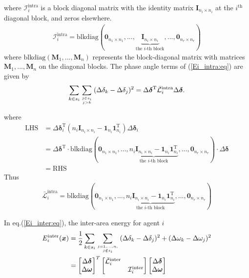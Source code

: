 \documentclass[12pt, draftclsnofoot,onecolumn]{IEEEtran}
\begin{document}
\noindent where $\mathcal I_i^{\mathrm{intra}}$ is a block diagonal matrix with the identity matrix $\boldsymbol{I}_{n_i\times n_i}$ at the $i^{\mathrm{th}}$ diagonal block, and zeros elsewhere.
\begin{align}
\mathcal{I}_i^{\mathrm{intra}} = \mathrm{blkdiag}(\boldsymbol{0}_{n_1\times n_1},..., \underbrace{\boldsymbol{I}_{n_i\times n_i}}_{\mbox{the $i$-th block}},..., \boldsymbol{0}_{n_r\times n_r})
\end{align}
\noindent where $\mathrm{blkdiag}(\boldsymbol{M}_1,...,\boldsymbol{M}_n)$ represents the block-diagonal matrix with matrices $\boldsymbol{M}_1,...,\boldsymbol{M}_n$ on the diagonal blocks. The phase angle terms of (\ref{Ei_intra:eq}) are given by
\begin{align}
\sum_{k\in s_i}\sum_{j\in s_i \atop j>k}{(\Delta \delta_k-\Delta \delta_j)^2} = \Delta {\boldsymbol \delta}^{\mathrm{T}} \bar {\mathcal L}_i^{\mathrm{intra}} \Delta {\boldsymbol \delta}.
\end{align}

\noindent where
\begin{align}
\mathrm{LHS} &= \Delta \boldsymbol{\delta}_i^{\mathrm{T}} \left( n_i \boldsymbol{I}_{n_i\times n_i} - \boldsymbol{1}_{n_i}\boldsymbol{1}_{n_i}^\mathrm{T} \right) \Delta \boldsymbol{\delta}_i \nonumber\\
&= \Delta \boldsymbol{\delta}^{\mathrm{T}} \cdot \mathrm{blkdiag}(\boldsymbol{0}_{n_1\times n_1},..., \underbrace{n_i \boldsymbol{I}_{n_i\times n_i} - \boldsymbol{1}_{n_i}\boldsymbol{1}_{n_i}^\mathrm{T}}_{\mbox{the $i$-th block}},..., \boldsymbol{0}_{n_r\times n_r}) \cdot \Delta \boldsymbol{\delta}\nonumber\\
&= \mathrm{RHS}
\end{align} 
\noindent Thus
\begin{align}
 \bar {\mathcal L}_i^{\mathrm{intra}}= \mathrm{blkdiag}(\boldsymbol{0}_{n_1\times n_1},..., \underbrace{n_i \boldsymbol{I}_{n_i\times n_i} - \boldsymbol{1}_{n_i}\boldsymbol{1}_{n_i}^\mathrm{T}}_{\mbox{the $i$-th block}},..., \boldsymbol{0}_{n_r\times n_r})
\end{align}


In eq.(\ref{Ei_inter:eq}), the inter-area energy for agent $i$
\begin{align}
E_i^{\mathrm{inter}}(\boldsymbol{x})&=\frac{1}{2}\sum_{k\in s_i}\sum_{j=1,...,n,\atop j \notin s_i}{(\Delta \delta_k-\Delta \delta_j)^2 + (\Delta \omega_k-\Delta \omega_j)^2}\nonumber\\
&= \begin{bmatrix}\Delta {\boldsymbol \delta}\\ \Delta {\boldsymbol \omega}\end{bmatrix}^T
\begin{bmatrix}\bar {\mathcal L}_i^{\mathrm{inter}} & ~\\
~& \mathcal{I}_{i}^{\mathrm{inter}}\end{bmatrix}
\begin{bmatrix}\Delta {\boldsymbol \delta}\\ \Delta {\boldsymbol \omega}\end{bmatrix}
\end{align}
\end{document}
